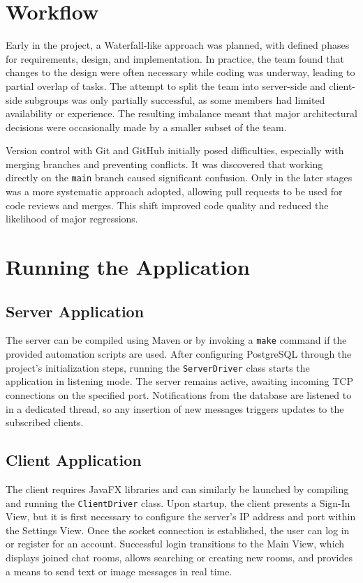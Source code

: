 \documentclass[12pt,a4paper]{report}
\begin{document}
\chapter{Workflow}
Early in the project, a Waterfall-like approach was planned, with defined
phases for requirements, design, and implementation. In practice, the team
found that changes to the design were often necessary while coding was
underway, leading to partial overlap of tasks. The attempt to split the team
into server-side and client-side subgroups was only partially successful, as
some members had limited availability or experience. The resulting imbalance
meant that major architectural decisions were occasionally made by a smaller
subset of the team.

Version control with Git and GitHub initially posed difficulties, especially
with merging branches and preventing conflicts. It was discovered that working
directly on the \texttt{main} branch caused significant confusion. Only in the
later stages was a more systematic approach adopted, allowing pull requests to
be used for code reviews and merges. This shift improved code quality and
reduced the likelihood of major regressions.

\chapter{Running the Application}
\section{Server Application}
The server can be compiled using Maven or by invoking a \texttt{make} command
if the provided automation scripts are used. After configuring PostgreSQL
through the project's initialization steps, running the \texttt{ServerDriver}
class starts the application in listening mode. The server remains active,
awaiting incoming TCP connections on the specified port. Notifications from the
database are listened to in a dedicated thread, so any insertion of new
messages triggers updates to the subscribed clients.

\section{Client Application}
The client requires JavaFX libraries and can similarly be launched by compiling
and running the \texttt{ClientDriver} class. Upon startup, the client presents
a Sign-In View, but it is first necessary to configure the server's IP address
and port within the Settings View. Once the socket connection is established,
the user can log in or register for an account. Successful login transitions to
the Main View, which displays joined chat rooms, allows searching or creating
new rooms, and provides a means to send text or image messages in real time.
\end{document}
